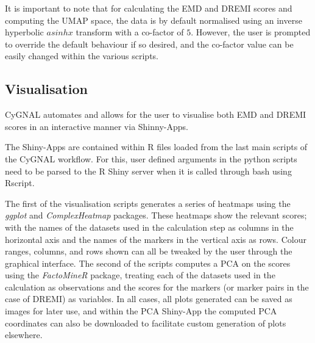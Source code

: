 It is important to note that for calculating the EMD and DREMI scores and computing the UMAP space, the data is by default normalised using an inverse hyperbolic \(asinh x\) transform with a co-factor of \(5\). However, the user is prompted to override the default behaviour if so desired, and the co-factor value can be easily changed within the various scripts.

\subsection{Visualisation}

CyGNAL  automates and allows for the user to visualise both EMD and DREMI scores in an interactive manner via Shinny-Apps\cite{noauthor_rstudioshiny_2021}. 

The Shiny-Apps are contained within R files loaded from the last main scripts of the CyGNAL workflow. For this, user defined arguments in the python scripts need to be parsed to the R Shiny server when it is called through bash using Rscript.

The first of the visualisation scripts generates a series of heatmaps using the \emph{ggplot}\cite{wickham_ggplot2_2009} and \emph{ComplexHeatmap}\cite{gu_complexheatmap_2021} packages. These heatmaps show the relevant scores; with the names of the datasets used in the calculation step as columns in the horizontal axis and the names of the markers in the vertical axis as rows. Colour ranges, columns, and rows shown can all be tweaked by the user through the graphical interface. 
The second of the scripts computes a PCA on the scores using the \emph{FactoMineR} package\cite{le_factominer_2008}, treating each of the datasets used in the calculation as observations and the scores for the markers (or marker pairs in the case of DREMI) as variables. In all cases, all plots generated can be saved as images for later use, and within the PCA Shiny-App the computed PCA coordinates can also be downloaded to facilitate custom generation of plots elsewhere.


